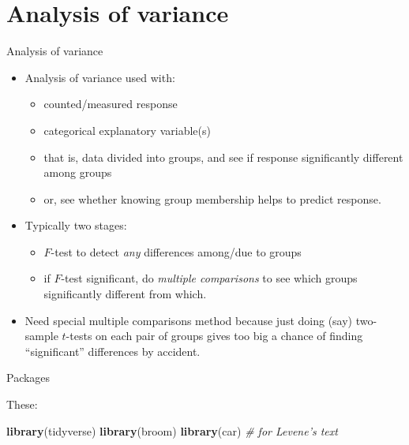 \documentclass[ignorenonframetext,]{beamer}
\newenvironment{Shaded}{\begin{snugshade}}{\end{snugshade}}
\newcommand{\CommentTok}[1]{\textcolor[rgb]{0.56,0.35,0.01}{\textit{#1}}}
\newcommand{\KeywordTok}[1]{\textcolor[rgb]{0.13,0.29,0.53}{\textbf{#1}}}
\newcommand{\NormalTok}[1]{#1}
\begin{document}
\hypertarget{analysis-of-variance}{%
\section{Analysis of variance}\label{analysis-of-variance}}

\begin{frame}{Analysis of variance}
\protect\hypertarget{analysis-of-variance-1}{}

\begin{itemize}
\item
  Analysis of variance used with:

  \begin{itemize}
  \item
    counted/measured response
  \item
    categorical explanatory variable(s)
  \item
    that is, data divided into groups, and see if response significantly
    different among groups
  \item
    or, see whether knowing group membership helps to predict response.
  \end{itemize}
\item
  Typically two stages:

  \begin{itemize}
  \item
    \(F\)-test to detect \emph{any} differences among/due to groups
  \item
    if \(F\)-test significant, do \emph{multiple comparisons} to see
    which groups significantly different from which.
  \end{itemize}
\item
  Need special multiple comparisons method because just doing (say)
  two-sample \(t\)-tests on each pair of groups gives too big a chance
  of finding ``significant'' differences by accident.
\end{itemize}

\end{frame}

\begin{frame}[fragile]{Packages}
\protect\hypertarget{packages-2}{}

These:

\begin{Shaded}
\begin{Highlighting}[]
\KeywordTok{library}\NormalTok{(tidyverse)}
\KeywordTok{library}\NormalTok{(broom)}
\KeywordTok{library}\NormalTok{(car) }\CommentTok{# for Levene's text}
\end{Highlighting}
\end{Shaded}

\end{frame}
\end{document}
